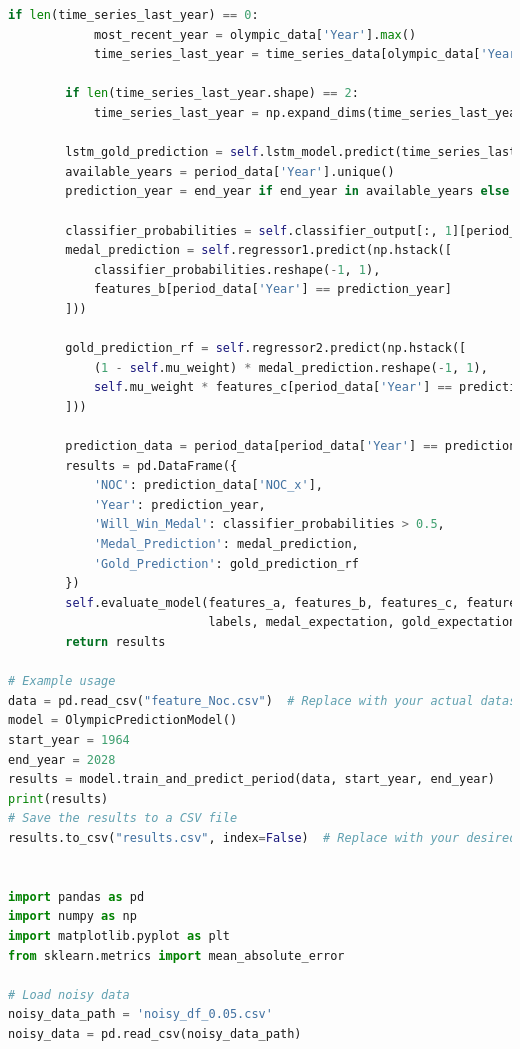 \documentclass[12pt]{article}
\begin{document}
\begin{lstlisting}[language=Python, style=mystyle, caption=model.ipynb]
        if len(time_series_last_year) == 0:
            most_recent_year = olympic_data['Year'].max()
            time_series_last_year = time_series_data[olympic_data['Year'] == most_recent_year]

        if len(time_series_last_year.shape) == 2:
            time_series_last_year = np.expand_dims(time_series_last_year, axis=0)

        lstm_gold_prediction = self.lstm_model.predict(time_series_last_year, verbose=0)
        available_years = period_data['Year'].unique()
        prediction_year = end_year if end_year in available_years else available_years.max()

        classifier_probabilities = self.classifier_output[:, 1][period_data['Year'] == prediction_year]
        medal_prediction = self.regressor1.predict(np.hstack([
            classifier_probabilities.reshape(-1, 1), 
            features_b[period_data['Year'] == prediction_year]
        ]))

        gold_prediction_rf = self.regressor2.predict(np.hstack([
            (1 - self.mu_weight) * medal_prediction.reshape(-1, 1),
            self.mu_weight * features_c[period_data['Year'] == prediction_year]
        ]))

        prediction_data = period_data[period_data['Year'] == prediction_year].reset_index(drop=True)
        results = pd.DataFrame({
            'NOC': prediction_data['NOC_x'],
            'Year': prediction_year,
            'Will_Win_Medal': classifier_probabilities > 0.5,
            'Medal_Prediction': medal_prediction,
            'Gold_Prediction': gold_prediction_rf
        })
        self.evaluate_model(features_a, features_b, features_c, features_all, 
                            labels, medal_expectation, gold_expectation, period_data)
        return results
    
# Example usage
data = pd.read_csv("feature_Noc.csv")  # Replace with your actual dataset
model = OlympicPredictionModel()
start_year = 1964
end_year = 2028
results = model.train_and_predict_period(data, start_year, end_year)
print(results)
# Save the results to a CSV file
results.to_csv("results.csv", index=False)  # Replace with your desired file path


import pandas as pd
import numpy as np
import matplotlib.pyplot as plt
from sklearn.metrics import mean_absolute_error

# Load noisy data
noisy_data_path = 'noisy_df_0.05.csv'
noisy_data = pd.read_csv(noisy_data_path)


\end{lstlisting}
\end{document}
